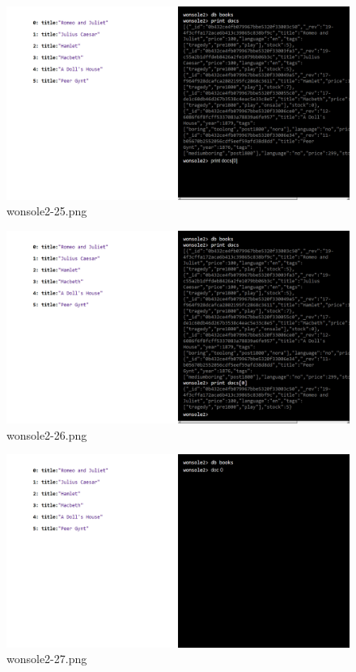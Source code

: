 \clearpage
\begin{figure}
\includegraphics[width=\textwidth]{screenshot/wonsole2/wonsole2-25.png}
\caption{wonsole2-25.png}
\label{wonsole2-25.png}
\end{figure}


\begin{figure}
\includegraphics[width=\textwidth]{screenshot/wonsole2/wonsole2-26.png}
\caption{wonsole2-26.png}
\label{wonsole2-26.png}
\end{figure}


\clearpage
\begin{figure}
\includegraphics[width=\textwidth]{screenshot/wonsole2/wonsole2-27.png}
\caption{wonsole2-27.png}
\label{wonsole2-27.png}
\end{figure}


